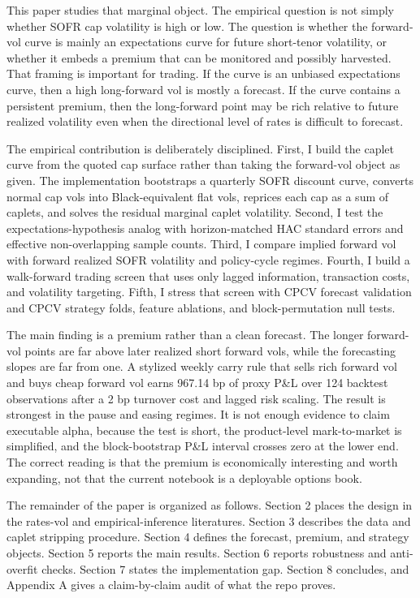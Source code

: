 \documentclass[12pt]{article}
\begin{document}
This paper studies that marginal object. The empirical question is not simply whether SOFR cap
volatility is high or low. The question is whether the forward-vol curve is mainly an expectations
curve for future short-tenor volatility, or whether it embeds a premium that can be monitored and
possibly harvested. That framing is important for trading. If the curve is an unbiased expectations
curve, then a high long-forward vol is mostly a forecast. If the curve contains a persistent premium,
then the long-forward point may be rich relative to future realized volatility even when the
directional level of rates is difficult to forecast.

The empirical contribution is deliberately disciplined. First, I build the caplet curve from the
quoted cap surface rather than taking the forward-vol object as given. The implementation
bootstraps a quarterly SOFR discount curve, converts normal cap vols into Black-equivalent flat
vols, reprices each cap as a sum of caplets, and solves the residual marginal caplet volatility.
Second, I test the expectations-hypothesis analog with horizon-matched HAC standard errors and
effective non-overlapping sample counts. Third, I compare implied forward vol with forward
realized SOFR volatility and policy-cycle regimes. Fourth, I build a walk-forward trading screen
that uses only lagged information, transaction costs, and volatility targeting. Fifth, I stress that
screen with CPCV forecast validation and CPCV strategy folds, feature ablations,
and block-permutation null tests.

The main finding is a premium rather than a clean forecast. The longer forward-vol points are far
above later realized short forward vols, while the forecasting slopes are far from one. A stylized
weekly carry rule that sells rich forward vol and buys cheap forward vol earns 967.14 bp of proxy
P\&L over 124 backtest observations after a 2 bp turnover cost and lagged risk scaling. The result
is strongest in the pause and easing regimes. It is not enough evidence to claim executable alpha,
because the test is short, the product-level mark-to-market is simplified, and the block-bootstrap
P\&L interval crosses zero at the lower end. The correct reading is that the premium is
economically interesting and worth expanding, not that the current notebook is a deployable
options book.

The remainder of the paper is organized as follows. Section 2 places the design in the rates-vol
and empirical-inference literatures. Section 3 describes the data and caplet stripping procedure.
Section 4 defines the forecast, premium, and strategy objects. Section 5 reports the main results.
Section 6 reports robustness and anti-overfit checks. Section 7 states the implementation gap.
Section 8 concludes, and Appendix A gives a
claim-by-claim audit of what the repo proves.
\end{document}

